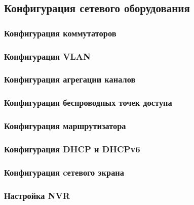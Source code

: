 \subsection{Конфигурация сетевого оборудования}
\subsubsection{Конфигурация коммутаторов}
\subsubsection{Конфигурация VLAN}
\subsubsection{Конфигурация агрегации каналов}
\subsubsection{Конфигурация беспроводных точек доступа}
\subsubsection{Конфигурация маршрутизатора}
\subsubsection{Конфигурация DHCP и DHCPv6}
\subsubsection{Конфигурация cетевого экрана}
\subsubsection{Настройка NVR}